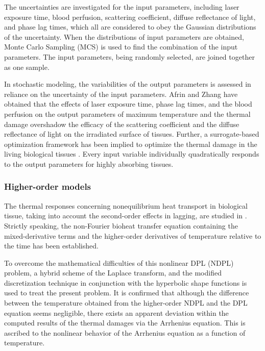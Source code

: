 \documentclass[sn-mathphys]{sn-jnl}%
\theoremstyle{thmstyleone}%
\theoremstyle{thmstyletwo}%
\theoremstyle{thmstylethree}%
\begin{document}
{The uncertainties are investigated for the input parameters, including laser exposure time, blood perfusion, scattering coefficient, diffuse reflectance of light, and phase lag times, which all are considered to obey the Gaussian distributions of the uncertainty. When the distributions of input parameters are obtained, Monte Carlo Sampling (MCS) is used to find the combination of the input parameters. The input parameters, being randomly selected, are joined together as one sample.

In stochastic modeling, the {variabilities} of the output parameters is assessed in reliance on the uncertainty of the input parameters. Afrin and Zhang have obtained that the effects of laser exposure time, phase lag times, and the blood perfusion on the output parameters of maximum temperature and the thermal damage overshadow the efficacy of the scattering coefficient and the diffuse reflectance of light on the irradiated surface of tissues. Further, a surrogate-based optimization framework has been implied to optimize the thermal damage in the living biological tissues \cite{Afrin2019}. Every input variable individually quadratically responds to the output parameters for highly absorbing tissues.
{
\subsubsection{Higher-order models}
The thermal responses concerning nonequilibrium heat transport in biological tissue, taking into account the second-order effects in lagging, are studied in \cite{Liu20152}. Strictly speaking, the non-Fourier bioheat transfer equation containing the mixed-derivative terms and the higher-order derivatives of temperature relative to the time has been established.} To overcome the mathematical difficulties of this nonlinear DPL (NDPL) problem, a hybrid scheme of the Laplace transform, and the modified discretization technique \cite{KLiu2011} in conjunction with the hyperbolic shape functions is used to treat the present problem. It is confirmed that although the difference between the temperature obtained from the higher-order NDPL and the DPL equation seems negligible, there exists an apparent deviation within the computed results of the thermal damages via the Arrhenius equation. This is ascribed to the nonlinear behavior of the Arrhenius equation as a function of temperature.}


\end{document}
